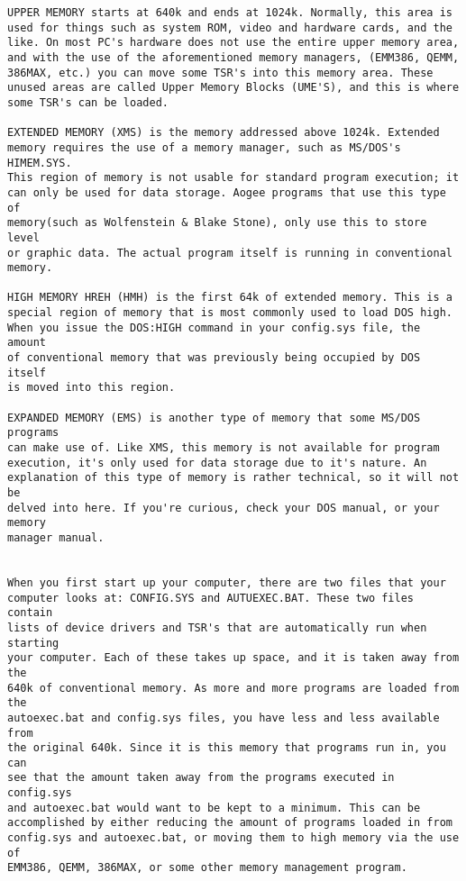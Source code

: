 \documentclass[book.tex]{subfiles}
\begin{document}
\begin{breakable_box}
\begin{verbatim}
UPPER MEMORY starts at 640k and ends at 1024k. Normally, this area is
used for things such as system ROM, video and hardware cards, and the
like. On most PC's hardware does not use the entire upper memory area,
and with the use of the aforementioned memory managers, (EMM386, QEMM,
386MAX, etc.) you can move some TSR's into this memory area. These 
unused areas are called Upper Memory Blocks (UME'S), and this is where
some TSR's can be loaded.

EXTENDED MEMORY (XMS) is the memory addressed above 1024k. Extended 
memory requires the use of a memory manager, such as MS/DOS's HIMEM.SYS.
This region of memory is not usable for standard program execution; it
can only be used for data storage. Aogee programs that use this type of
memory(such as Wolfenstein & Blake Stone), only use this to store level
or graphic data. The actual program itself is running in conventional
memory. 

HIGH MEMORY HREH (HMH) is the first 64k of extended memory. This is a
special region of memory that is most commonly used to load DOS high. 
When you issue the DOS:HIGH command in your config.sys file, the amount 
of conventional memory that was previously being occupied by DOS itself 
is moved into this region.

EXPANDED MEMORY (EMS) is another type of memory that some MS/DOS programs
can make use of. Like XMS, this memory is not available for program
execution, it's only used for data storage due to it's nature. An
explanation of this type of memory is rather technical, so it will not be
delved into here. If you're curious, check your DOS manual, or your memory
manager manual.


When you first start up your computer, there are two files that your
computer looks at: CONFIG.SYS and AUTUEXEC.BAT. These two files contain
lists of device drivers and TSR's that are automatically run when starting
your computer. Each of these takes up space, and it is taken away from the
640k of conventional memory. As more and more programs are loaded from the
autoexec.bat and config.sys files, you have less and less available from
the original 640k. Since it is this memory that programs run in, you can
see that the amount taken away from the programs executed in config.sys
and autoexec.bat would want to be kept to a minimum. This can be
accomplished by either reducing the amount of programs loaded in from 
config.sys and autoexec.bat, or moving them to high memory via the use of
EMM386, QEMM, 386MAX, or some other memory management program.   
   \end{verbatim}

 \end{breakable_box}
\end{document}
